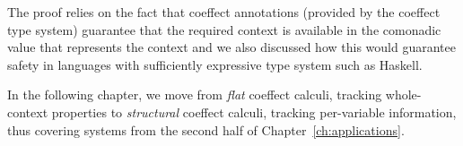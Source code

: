 The proof relies on the fact that coeffect annotations (provided by the coeffect type system)
guarantee that the required context is available in the comonadic value that represents the 
context and we also discussed how this would guarantee safety in languages with sufficiently
expressive type system such as Haskell.

In the following chapter, we move from \emph{flat} coeffect calculi, tracking whole-context
properties to \emph{structural} coeffect calculi, tracking per-variable information, thus
covering systems from the second half of Chapter~\ref{ch:applications}.
















